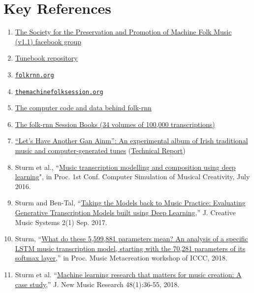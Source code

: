 \documentclass[a4paper,notitlepage,twoside]{book}
\begin{document}
\section{Key References}
\begin{enumerate}
\item \href{https://www.facebook.com/groups/TheMFSociety/}{The Society for the Preservation and Promotion of Machine Folk Music (v1.1) facebook group}
\item \href{https://github.com/boblsturm/MFSocietyTunebook}{Tunebook repository}
\item \href{https://folkrnn.org/}{{\tt folkrnn.org}}
\item \href{https://themachinefolksession.org/}{{\tt themachinefolksession.org}}
\item \href{https://github.com/IraKorshunova/folk-rnn}{The computer code and data behind folk-rnn}
\item \href{https://highnoongmt.wordpress.com/2018/01/05/volumes-1-20-of-folk-rnn-v1-transcriptions}{The folk-rnn Session Books (34 volumes of 100,000 transcriptions)}
\item \href{https://soundcloud.com/oconaillfamilyandfriends}{``Let's Have Another Gan Ainm'': An experimental album of Irish traditional music and computer-generated tunes} (\href{http://urn.kb.se/resolve?urn=urn:nbn:se:kth:diva-235167}{Technical Report})
\item Sturm et al., ``\href{https://arxiv.org/pdf/1604.08723}{Music transcription modelling and composition using deep learning}", in Proc. 1st Conf. Computer Simulation of Musical Creativity, July 2016.
\item Sturm and Ben-Tal, ``\href{https://www.jcms.org.uk/article/id/517/}{Taking the Models back to Music Practice: Evaluating Generative Transcription Models built using Deep Learning},” J. Creative Music Systems 2(1) Sep. 2017.
\item Sturm, ``\href{http://urn.kb.se/resolve?urn=urn:nbn:se:kth:diva-238604}{What do these 5,599,881 parameters mean? An analysis of a specific LSTM music transcription model, starting with the 70,281 parameters of its softmax layer},” in Proc. Music Metacreation workshop of ICCC, 2018.
\item Sturm et al. ``\href{https://www.tandfonline.com/doi/full/10.1080/09298215.2018.1515233}{Machine learning research that matters for music creation: A case study},” J. New Music Research 48(1):36-55, 2018.

\end{enumerate}
\end{document}

